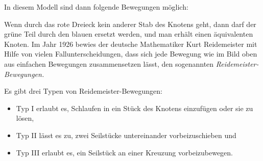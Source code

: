 \documentclass{zusammenfassung}
\begin{document}
\begin{center}
\end{center}

In diesem Modell sind dann folgende Bewegungen möglich:

\begin{center}
\end{center}

Wenn durch das rote Dreieck kein anderer Stab des Knotens geht, dann darf der grüne Teil durch den blauen ersetzt werden, und man
erhält einen äquivalenten Knoten. Im Jahr 1926 bewies der deutsche Mathematiker Kurt Reidemeister mit Hilfe von vielen
Fallunterscheidungen, dass sich jede Bewegung wie im Bild oben aus einfachen Bewegungen zusammensetzen lässt, den sogenannten
\emph{Reidemeister-Bewegungen.}

Es gibt drei Typen von Reidemeister-Bewegungen:
\begin{itemize}
  \item Typ I erlaubt es, Schlaufen in ein Stück des Knotens einzufügen oder sie zu lösen,
  \item Typ II lässt es zu, zwei Seilstücke untereinander vorbeizuschieben und
  \item Typ III erlaubt es, ein Seilstück an einer Kreuzung vorbeizubewegen.
\end{itemize}
\end{document}
